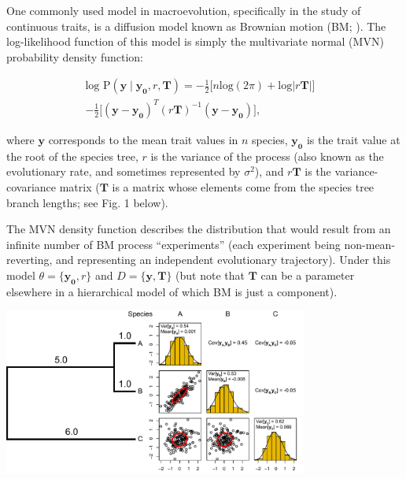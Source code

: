 \documentclass[oneside]{article}
\begin{document}
\begin{tcolorbox}[breakable, width=12cm, colback=gray!10, boxrule=0pt,
  break at=11cm/0cm, title=Box 1: Models with well-known parametric \emph{pdf}'s, fonttitle=\bfseries]
  \small 
  One commonly used model in macroevolution, specifically in the study
of continuous traits, is a diffusion model known as
Brownian motion (BM; \citealt{felsenstein73}).
The log-likelihood function of this model is simply the multivariate
normal (MVN) probability density function:

\begin{equation}
  \begin{split}
    \text{log P}(\mathbf{y} \mid \mathbf{y_0}, r, \mathbf{T}) = -\frac{1}{2} \Big[ n\text{log}(2\pi) + \text{log}|r \mathbf{T}| \Big] & \\
    -\frac{1}{2} \Big[ (\mathbf{y} - \mathbf{y_0})^T (r \mathbf{T})^{-1} (\mathbf{y} - \mathbf{y_0}) \Big],
  \label{eq:bm}
  \end{split}
\end{equation}

\noindent where $\mathbf{y}$ corresponds to the mean trait values in $n$ species,
$\mathbf{y_0}$ is the trait value at the root of the species tree, $r$ is the variance of the process
(also known as the evolutionary rate, and sometimes represented by $\sigma^2$), and $r\mathbf{T}$ is the
variance-covariance matrix ($\mathbf{T}$ is a matrix whose elements
come from the species tree branch lengths; see Fig. 1 below).

\vspace{.25cm}
The MVN density function describes the distribution that would result from an infinite
number of BM process ``experiments'' (each experiment being non-mean-reverting, and
representing an independent evolutionary trajectory).
Under this model $\theta = \{\mathbf{y_0},
r\}$ and $D = \{\mathbf{y, \mathbf{T}} \}$ (but note that $\mathbf{T}$ can
be a parameter elsewhere in a hierarchical model of which BM is just a
component).


\includegraphics[width=10cm]{../figures/bmsim.pdf}
\label{fig:bmsim}


\end{tcolorbox}
\end{document}
